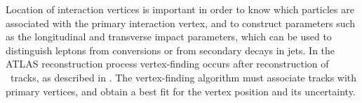 Location of interaction vertices is 
important in order to know which particles are
associated with the primary interaction vertex, and to construct parameters such as the
longitudinal and transverse impact parameters, which can be used to distinguish 
leptons from conversions or from secondary decays in jets.
In the ATLAS reconstruction process vertex-finding occurs after reconstruction of
\id\ tracks, as described in . The
vertex-finding algorithm must associate tracks with primary vertices, and obtain
a best fit for the vertex position and its uncertainty. 

%


